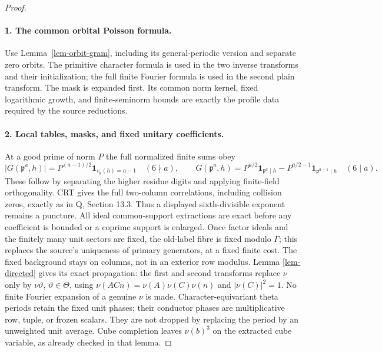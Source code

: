 \documentclass[11pt,a4paper]{article}
\theoremstyle{remark}\newtheorem{remark}[theorem]{Remark}
\newcommand{\one}{\mathbf 1}
\numberwithin{equation}{section}
\begin{document}
\begin{proof}\leavevmode\par
\paragraph{1. The common orbital Poisson formula.}
Use Lemma~\ref{lem-orbit-gram}, including its general-periodic
version and separate zero orbits. The primitive character formula
is used in the two inverse transforms and their initialization;
the full finite Fourier formula is used in the second plain
transform. The mask is expanded first. Its common norm kernel,
fixed logarithmic growth, and finite-seminorm bounds are exactly
the profile data required by the source reductions.

\paragraph{2. Local tables, masks, and fixed unitary coefficients.}
At a good prime of norm $P$ the full normalized finite sums obey
\[
 |G(\mathfrak p^a,h)|=P^{(a-1)/2}
       \one_{v_{\mathfrak p}(h)=a-1}\quad(6\nmid a),
 \qquad
 G(\mathfrak p^a,h)=P^{a/2}\one_{\mathfrak p^a\mid h}
       -P^{a/2-1}\one_{\mathfrak p^{a-1}\mid h}\quad(6\mid a).
\]
These follow by separating the higher residue digits and applying
finite-field orthogonality. CRT gives the full two-column
correlations, including collision zeros, exactly as in Q,
Section 13.3. Thus a displayed sixth-divisible exponent remains
a puncture. All ideal common-support extractions are exact before
any coefficient is bounded or a coprime support is enlarged.
Once factor ideals and the finitely many unit sectors are fixed,
the old-label fibre is fixed modulo $\Gamma$; this replaces the
source's uniqueness of primary generators, at a fixed finite
cost. The fixed background stays on columns, not in an exterior
row modulus. Lemma \ref{lem-directed} gives its exact propagation:
the first and second transforms replace $\nu$ only by
$\nu\vartheta$, $\vartheta\in\Theta$, using
$\nu(ACn)=\nu(A)\nu(C)\nu(n)$ and $|\nu(C)|^2=1$.
No finite Fourier expansion of a genuine $\nu$ is made.
Character-equivariant theta periods retain the fixed unit phases;
their conductor phases are multiplicative row, tuple, or frozen
scalars. They are not dropped by replacing the period by an
unweighted unit average. Cube completion leaves $\nu(b)^3$ on
the extracted cube variable, as already checked in that lemma.


\end{proof}
\end{document}
